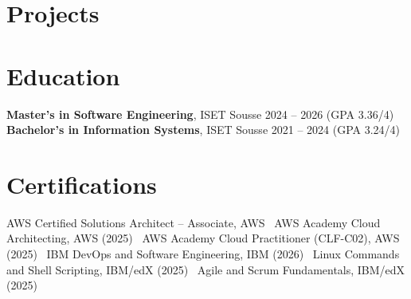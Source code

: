\documentclass[a4paper,10pt]{article}
\begin{document}
\section*{Projects}
\pBackup
\pWeatherETL
\pAWSFound

\section*{Education}
\textbf{Master's in Software Engineering}, ISET Sousse \hfill 2024 -- 2026 (GPA 3.36/4)\\
\textbf{Bachelor's in Information Systems}, ISET Sousse \hfill 2021 -- 2024 (GPA 3.24/4)

\section*{Certifications}
AWS Certified Solutions Architect -- Associate, AWS \textbar\ AWS Academy Cloud Architecting, AWS (2025) \textbar\ AWS Academy Cloud Practitioner (CLF-C02), AWS (2025) \textbar\ IBM DevOps and Software Engineering, IBM (2026) \textbar\ Linux Commands and Shell Scripting, IBM/edX (2025) \textbar\ Agile and Scrum Fundamentals, IBM/edX (2025)
\end{document}
